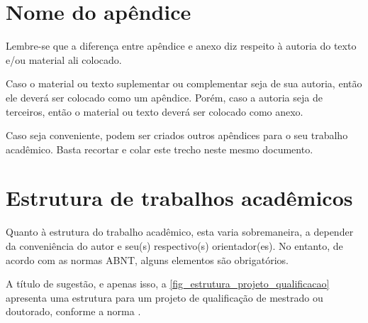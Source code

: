 
\begin{apendicesenv}
    \partapendices


    \chapter{Nome do apêndice}
    \label{chap_apendice_a}

    Lembre-se que a diferença entre apêndice e anexo diz respeito à autoria do texto e/ou material ali colocado.

    Caso o material ou texto suplementar ou complementar seja de sua autoria, então ele deverá ser colocado como um apêndice.
    Porém, caso a autoria seja de terceiros, então o material ou texto deverá ser colocado como anexo.

    Caso seja conveniente, podem ser criados outros apêndices para o seu trabalho acadêmico.
    Basta recortar e colar este trecho neste mesmo documento.


    \chapter{Estrutura de trabalhos acadêmicos}
    \label{chap_estrutura_de_trabalhos_academicos}

    Quanto à estrutura do trabalho acadêmico, esta varia sobremaneira, a depender da conveniência do autor e seu(s) respectivo(s) orientador(es).
    No entanto, de acordo com as normas ABNT, alguns elementos são obrigatórios.

    A título de sugestão, e apenas isso, a \autoref{fig_estrutura_projeto_qualificacao} apresenta uma estrutura para um projeto de qualificação de mestrado ou doutorado, conforme a norma .


\end{apendicesenv}
